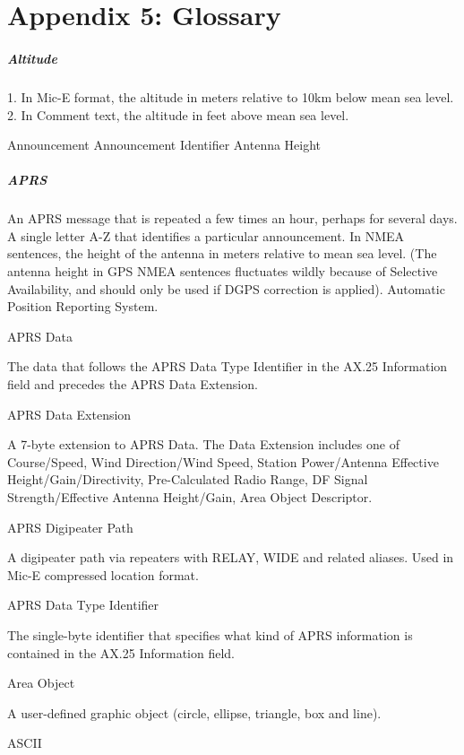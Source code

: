 \chapter{Appendix 5: Glossary}


\paragraph{Altitude}

1. In Mic-E format, the altitude in meters relative to 10km below mean sea level.
2. In Comment text, the altitude in feet above mean sea level.

Announcement
Announcement Identifier
Antenna Height

\paragraph {APRS}

An APRS message that is repeated a few times an hour, perhaps for several days.
A single letter A-Z that identifies a particular announcement.
In NMEA sentences, the height of the antenna in meters relative to mean sea level.
(The antenna height in GPS NMEA sentences fluctuates wildly because of Selective
Availability, and should only be used if DGPS correction is applied).
Automatic Position Reporting System.

APRS Data

The data that follows the APRS Data Type Identifier in the AX.25 Information field and
precedes the APRS Data Extension.

APRS Data Extension

A 7-byte extension to APRS Data. The Data Extension includes one of Course/Speed,
Wind Direction/Wind Speed, Station Power/Antenna Effective Height/Gain/Directivity,
Pre-Calculated Radio Range, DF Signal Strength/Effective Antenna Height/Gain, Area
Object Descriptor.

APRS Digipeater Path

A digipeater path via repeaters with RELAY, WIDE and related aliases. Used in Mic-E
compressed location format.

APRS Data Type Identifier

The single-byte identifier that specifies what kind of APRS information is contained in
the AX.25 Information field.

Area Object

A user-defined graphic object (circle, ellipse, triangle, box and line).

ASCII

